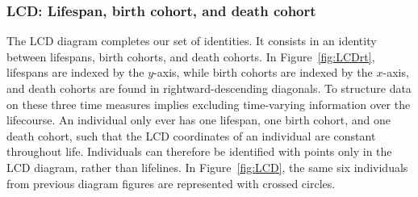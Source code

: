 \documentclass[12pt,oneside,a4paper]{article} %
\newcommand\tgh[1]{\raisebox{-.25\height}{\texttt{[image: Figures/triadtable/triad\#1.pdf]}}}
\begin{document}
\FloatBarrier
\subsubsection{LCD: Lifespan, birth cohort, and death cohort}%
\FloatBarrier

The LCD diagram completes our set of identities. It consists in an identity
between lifespans, birth cohorts, and death cohorts. In Figure~\ref{fig:LCDrt},
lifespans are indexed by the $y$-axis, while birth cohorts are indexed by the $x$-axis, and death cohorts
are found in rightward-descending diagonals. To structure data on these three
time measures implies excluding time-varying information over the lifecourse.
An individual
only ever has one lifespan, one birth cohort, and one death cohort, such that
the LCD coordinates of an individual are constant throughout life.
Individuals can therefore be identified with points only in the LCD diagram,
rather than lifelines. In Figure~\ref{fig:LCD}, the same six individuals from
previous diagram figures are represented with crossed circles.
\end{document}
